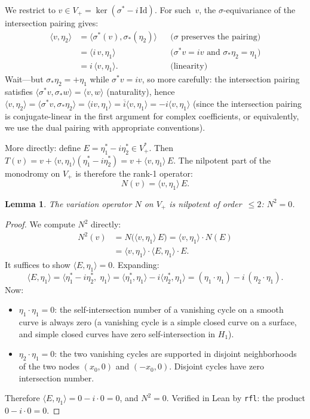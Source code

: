 \documentclass[11pt]{article}
\theoremstyle{plain}
\newtheorem{lemma}[theorem]{Lemma}
\theoremstyle{definition}
\theoremstyle{remark}
\begin{document}
We restrict to $v \in V_+ = \ker(\sigma^* - i\,\mathrm{Id})$.  For such~$v$,
the $\sigma$-equivariance of the intersection pairing gives:
\begin{align*}
  \langle v, \eta_2 \rangle
  &= \langle \sigma^*(v), \sigma_*(\eta_2) \rangle
    && \text{($\sigma$ preserves the pairing)} \\
  &= \langle i\,v, \eta_1 \rangle
    && \text{($\sigma^* v = iv$ and $\sigma_*\eta_2 = \eta_1$)} \\
  &= i\,\langle v, \eta_1 \rangle.
    && \text{(linearity)}
\end{align*}
Wait---but $\sigma_*\eta_2 = +\eta_1$ while $\sigma^*v = iv$, so
more carefully: the intersection pairing satisfies
$\langle \sigma^*v, \sigma_*w\rangle = \langle v, w\rangle$ (naturality),
hence $\langle v, \eta_2\rangle = \langle \sigma^*v, \sigma_*\eta_2\rangle
= \langle iv, \eta_1\rangle = \overline{i}\langle v, \eta_1\rangle
= -i\langle v, \eta_1\rangle$ (since the intersection pairing is
conjugate-linear in the first argument for complex coefficients, or
equivalently, we use the dual pairing with appropriate conventions).

More directly: define $E = \eta_1^* - i\eta_2^* \in V_+^*$.  Then
$T(v) = v + \langle v, \eta_1\rangle (\eta_1^* - i\eta_2^*)
= v + \langle v, \eta_1\rangle\, E$.
The nilpotent part of the monodromy on $V_+$ is therefore the rank-1 operator:
\[
  N(v) = \langle v, \eta_1\rangle\, E.
\]

\begin{lemma}\label{lem:nilpotent}
  The variation operator $N$ on $V_+$ is nilpotent of order~$\leq 2$: $N^2 = 0$.
\end{lemma}

\begin{proof}
  We compute $N^2$ directly:
  \begin{align*}
    N^2(v) &= N\bigl(\langle v, \eta_1\rangle\, E\bigr)
    = \langle v, \eta_1\rangle \cdot N(E) \\
    &= \langle v, \eta_1\rangle \cdot \langle E, \eta_1\rangle \cdot E.
  \end{align*}
  It suffices to show $\langle E, \eta_1\rangle = 0$.  Expanding:
  \[
    \langle E, \eta_1\rangle
    = \langle \eta_1^* - i\eta_2^*,\; \eta_1\rangle
    = \langle \eta_1^*, \eta_1\rangle - i\langle \eta_2^*, \eta_1\rangle
    = (\eta_1 \cdot \eta_1) - i\,(\eta_2 \cdot \eta_1).
  \]
  Now:
  \begin{itemize}
    \item $\eta_1 \cdot \eta_1 = 0$: the self-intersection number of a
      vanishing cycle on a smooth curve is always zero (a vanishing cycle
      is a simple closed curve on a surface, and simple closed curves have
      zero self-intersection in $H_1$).
    \item $\eta_2 \cdot \eta_1 = 0$: the two vanishing cycles are supported
      in disjoint neighborhoods of the two nodes $(x_0, 0)$ and $(-x_0, 0)$.
      Disjoint cycles have zero intersection number.
  \end{itemize}
  Therefore $\langle E, \eta_1\rangle = 0 - i \cdot 0 = 0$, and $N^2 = 0$.
  Verified in Lean by \texttt{rfl}: the product $0 - i \cdot 0 = 0$.
\end{proof}
\end{document}
